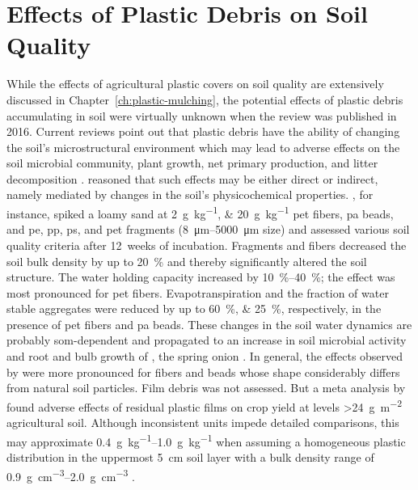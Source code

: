 \section{Effects of Plastic Debris on Soil Quality}
\label{sec:general-discussion:effects}

While the effects of agricultural plastic covers on soil quality are extensively discussed in Chapter~\ref{ch:plastic-mulching}, the potential effects of plastic debris accumulating in soil were virtually unknown when the review was published in 2016.
Current reviews point out that plastic debris have the ability of changing the soil's microstructural environment which may lead to adverse effects on the soil microbial community, plant growth, net primary production, and litter decomposition \citep{RilligMicroplastic2021,MbachuRise2021,QiBehavior2020}.  reasoned that such effects may be either direct or indirect, namely mediated by changes in the soil's physicochemical properties. , for instance, spiked a loamy sand at \SIlist{2;20}{\gram\per\kilo\gram} \ac{pet} fibers, \ac{pa} beads, and \ac{pe}, \ac{pp}, \ac{ps}, and \ac{pet} fragments (\SIrange{8}{5000}{\micro\meter} size) and assessed various soil quality criteria after \SI{12}{weeks} of incubation. Fragments and fibers decreased the soil bulk density by up to \SI{20}{\percent} and thereby significantly altered the soil structure. The water holding capacity increased by \SIrange{10}{40}{\percent}; the effect was most pronounced for \ac{pet} fibers. Evapotranspiration and the fraction of water stable aggregates were reduced by up to \SIlist{60;25}{\percent}, respectively, in the presence of \ac{pet} fibers and \ac{pa} beads. These changes in the soil water dynamics are probably \ac{som}-dependent \citep{ZhangVariations2020,LiangEffects2021} and propagated to an increase in soil microbial activity and root and bulb growth of , the spring onion \citep{deSouzaMachadoMicroplastics2019}. In general, the effects observed by \citet{deSouzaMachadoMicroplastics2019} were more pronounced for fibers and beads whose shape considerably differs from natural soil particles. Film debris was not assessed. But a meta analysis by \citet{GaoEffects2019} found adverse effects of residual plastic films on crop yield at levels \SI{>24}{\gram\per\square\meter} agricultural soil. Although inconsistent units impede detailed comparisons, this may approximate \SIrange{0.4}{1.0}{\gram\per\kilo\gram} when assuming a homogeneous plastic distribution in the uppermost \SI{5}{\centi\meter} soil layer with a bulk density range of \SIrange{0.9}{2.0}{\gram\per\cubic\centi\meter} \citep{HornPhysical2016}.
